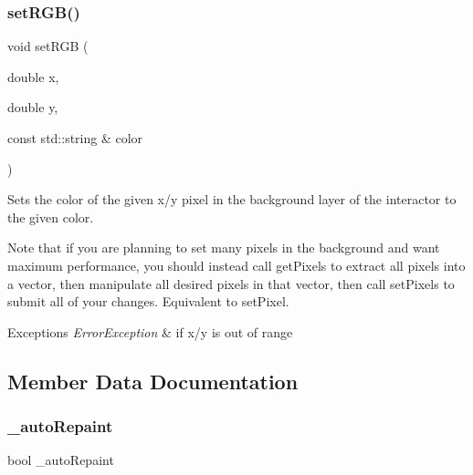 \subsubsection{\texorpdfstring{set\+R\+G\+B()}{setRGB()}\hspace{0.1cm}{\footnotesize\ttfamily [3/3]}}
{\footnotesize\ttfamily void set\+R\+GB (\begin{DoxyParamCaption}\item[{double}]{x,  }\item[{double}]{y,  }\item[{const std\+::string \&}]{color }\end{DoxyParamCaption})\hspace{0.3cm}{\ttfamily [virtual]}}



Sets the color of the given x/y pixel in the background layer of the interactor to the given color. 

Note that if you are planning to set many pixels in the background and want maximum performance, you should instead call get\+Pixels to extract all pixels into a vector, then manipulate all desired pixels in that vector, then call set\+Pixels to submit all of your changes. Equivalent to set\+Pixel.


\begin{DoxyExceptions}{Exceptions}
{\em Error\+Exception} & if x/y is out of range \\
\hline
\end{DoxyExceptions}


\subsection{Member Data Documentation}
\mbox{\label{classsgl_1_1GDrawingSurface_a738dd6afc69ac536ad46cf4d89a90933}} 
\subsubsection{\texorpdfstring{\+\_\+auto\+Repaint}{\_autoRepaint}}
{\footnotesize\ttfamily bool \+\_\+auto\+Repaint\hspace{0.3cm}{\ttfamily [protected]}}

\mbox{\label{classsgl_1_1GDrawingSurface_ad233544ea51cf6b435a199f3e3790607}} 
